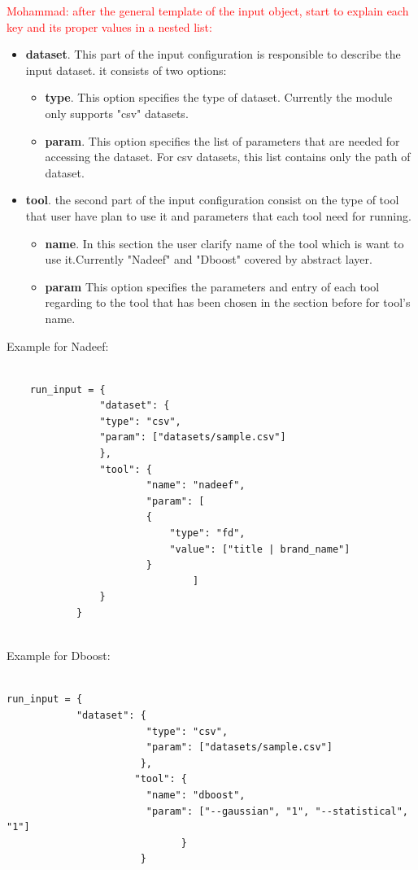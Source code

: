 \documentclass[12pt]{article}
\newcommand{\mohammad}[1]{\textcolor{red}{Mohammad: #1}}
\begin{document}
\mohammad{after the general template of the input object, start to explain each key and its proper values in a nested list:}
\begin{itemize}
	\item \textbf{dataset}. This part of the input configuration is responsible to describe the input dataset. it consists of two options:
	\begin{itemize}
		\item \textbf{type}. This option specifies the type of dataset. Currently the module only supports "csv" datasets.
		\item \textbf{param}. This option specifies the list of parameters that are needed for accessing the dataset. For csv datasets, this list contains only the path of dataset.
	\end{itemize}

	\item \textbf{tool}.
	the second part of the input configuration consist on the type of tool that user have plan to use it and parameters that each tool need for running.
	\begin{itemize}
		\item\textbf{name}.
		In this section the user clarify name of the tool which is want to use it.Currently "Nadeef" and "Dboost" covered by abstract layer.
	
		\item \textbf{param}
		This option specifies the parameters and entry of each tool regarding to the tool that has been chosen in the section before for tool's name.  
		
	\end{itemize}

\end{itemize}

Example for Nadeef:
\begin{lstlisting}

	run_input = {
				"dataset": {
				"type": "csv",
				"param": ["datasets/sample.csv"]
				},
				"tool": {
						"name": "nadeef",
						"param": [
						{
							"type": "fd",
							"value": ["title | brand_name"]
						}
								]
				}
			}
	
\end{lstlisting}
Example for Dboost:
\begin{lstlisting}

run_input = {
			"dataset": {
						"type": "csv",
						"param": ["datasets/sample.csv"]
					   },
					  "tool": {
						"name": "dboost",
						"param": ["--gaussian", "1", "--statistical", "1"]
							  }
					   }
\end{lstlisting}
\end{document}
